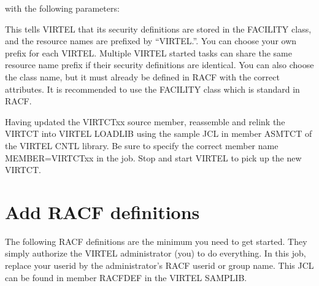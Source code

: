 \documentclass[letterpaper,10pt,english]{sphinxmanual}
\begin{document}
\begin{sphinxVerbatim}[commandchars=\\\{\}]
\end{sphinxVerbatim}

\sphinxAtStartPar
with the following parameters:

\begin{sphinxVerbatim}[commandchars=\\\{\}]
\end{sphinxVerbatim}

\sphinxAtStartPar
This tells VIRTEL that its security definitions are stored in the FACILITY class, and the resource names are prefixed by “VIRTEL.”. You can choose your own prefix for each VIRTEL. Multiple VIRTEL started tasks can share the same resource name prefix if their security definitions are identical. You can also choose the class name, but it must already be defined in RACF with the correct attributes. It is recommended to use the FACILITY class which is standard in RACF.

\sphinxAtStartPar
Having updated the VIRTCTxx source member, reassemble and relink the VIRTCT into VIRTEL LOADLIB using the sample JCL in member ASMTCT of the VIRTEL CNTL library. Be sure to specify the correct member name MEMBER=VIRTCTxx in the job. Stop and start VIRTEL to pick up the new VIRTCT.

\newpage

\ignorespaces 

\section{Add RACF definitions}
\label{\detokenize{Installation_Guide:add-racf-definitions}}\label{\detokenize{Installation_Guide:index-182}}
\sphinxAtStartPar
The following RACF definitions are the minimum you need to get started. They simply authorize the VIRTEL administrator (you) to do everything. In this job, replace your userid by the administrator’s RACF userid or group name. This JCL can be found in member RACFDEF in the VIRTEL SAMPLIB.
\end{document}
